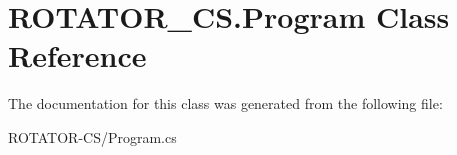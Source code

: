 \hypertarget{class_r_o_t_a_t_o_r___c_s_1_1_program}{}\section{R\+O\+T\+A\+T\+O\+R\+\_\+\+C\+S.\+Program Class Reference}
\label{class_r_o_t_a_t_o_r___c_s_1_1_program}


The documentation for this class was generated from the following file\+:\begin{DoxyCompactItemize}
\item 
R\+O\+T\+A\+T\+O\+R-\/\+C\+S/Program.\+cs\end{DoxyCompactItemize}
